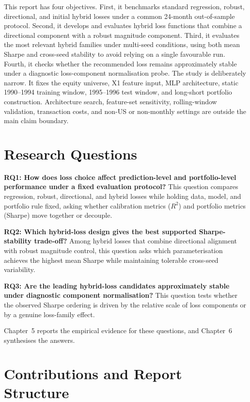 This report has four objectives.
First, it benchmarks standard regression, robust, directional, and initial hybrid losses under a common 24-month out-of-sample protocol.
Second, it develops and evaluates hybrid loss functions that combine a directional component with a robust magnitude component.
Third, it evaluates the most relevant hybrid families under multi-seed conditions, using both mean Sharpe and cross-seed stability to avoid relying on a single favourable run.
Fourth, it checks whether the recommended loss remains approximately stable under a diagnostic loss-component normalisation probe.
The study is deliberately narrow. It fixes the equity universe, X1 feature input, MLP architecture, static 1990--1994 training window, 1995--1996 test window, and long-short portfolio construction. Architecture search, feature-set sensitivity, rolling-window validation, transaction costs, and non-US or non-monthly settings are outside the main claim boundary.

\section{Research Questions}

\label{ch1:questions}

\textbf{RQ1: How does loss choice affect prediction-level and portfolio-level performance under a fixed evaluation protocol?}
This question compares regression, robust, directional, and hybrid losses while holding data, model, and portfolio rule fixed, asking whether calibration metrics ($R^2$) and portfolio metrics (Sharpe) move together or decouple.

\textbf{RQ2: Which hybrid-loss design gives the best supported Sharpe-stability trade-off?}
Among hybrid losses that combine directional alignment with robust magnitude control, this question asks which parameterisation achieves the highest mean Sharpe while maintaining tolerable cross-seed variability.

\textbf{RQ3: Are the leading hybrid-loss candidates approximately stable under diagnostic component normalisation?}
This question tests whether the observed Sharpe ordering is driven by the relative scale of loss components or by a genuine loss-family effect.

Chapter~5 reports the empirical evidence for these questions, and Chapter~6 synthesises the answers.

\section{Contributions and Report Structure}

